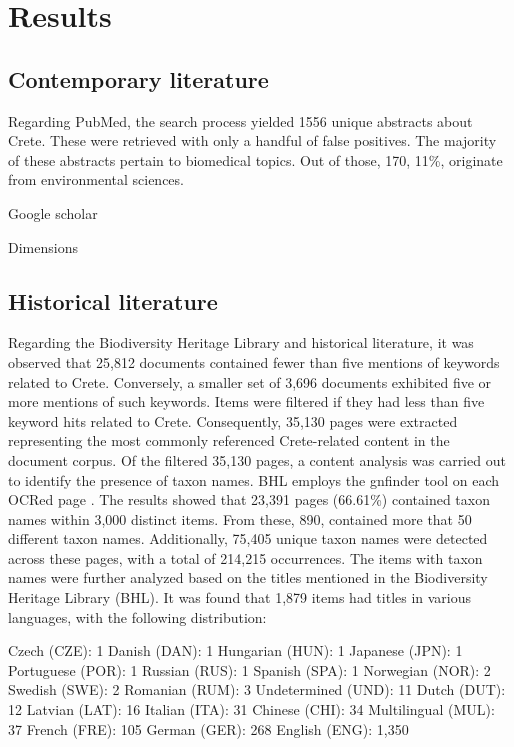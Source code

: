 \section{Results}\label{crete_idea_results}

\subsection{Contemporary literature}

Regarding PubMed, the search process yielded 1556 unique abstracts about Crete.
These were retrieved with only a handful of false positives.
The majority of these abstracts pertain to biomedical topics.
Out of those, 170, 11\%, originate from environmental sciences.

Google scholar 

Dimensions 

\subsection{Historical literature}
Regarding the Biodiversity Heritage Library and historical literature, it was
observed that 25,812 documents contained fewer than five mentions of keywords related to Crete.
Conversely, a smaller set of 3,696 documents exhibited five or more mentions of such keywords.
Items were filtered if they had less than five keyword hits related to Crete.
Consequently, 35,130 pages were extracted representing the most commonly referenced Crete-related content in the document corpus.
Of the filtered 35,130 pages, a content analysis was carried out to identify the presence of taxon names.
BHL employs the gnfinder tool on each OCRed page \parencite{mozzherin_gnamesgnfinder_2022}.
The results showed that 23,391 pages (66.61\%) contained taxon names within 3,000 distinct items.
From these, 890, contained more that 50 different taxon names.
Additionally, 75,405 unique taxon names were detected across these pages, with a total of 214,215 occurrences.
The items with taxon names were further analyzed based on the titles mentioned
in the Biodiversity Heritage Library (BHL). It was found that 1,879 items had titles in various languages, with the following distribution:

Czech (CZE): 1
Danish (DAN): 1
Hungarian (HUN): 1
Japanese (JPN): 1
Portuguese (POR): 1
Russian (RUS): 1
Spanish (SPA): 1
Norwegian (NOR): 2
Swedish (SWE): 2
Romanian (RUM): 3
Undetermined (UND): 11
Dutch (DUT): 12
Latvian (LAT): 16
Italian (ITA): 31
Chinese (CHI): 34
Multilingual (MUL): 37
French (FRE): 105
German (GER): 268
English (ENG): 1,350

